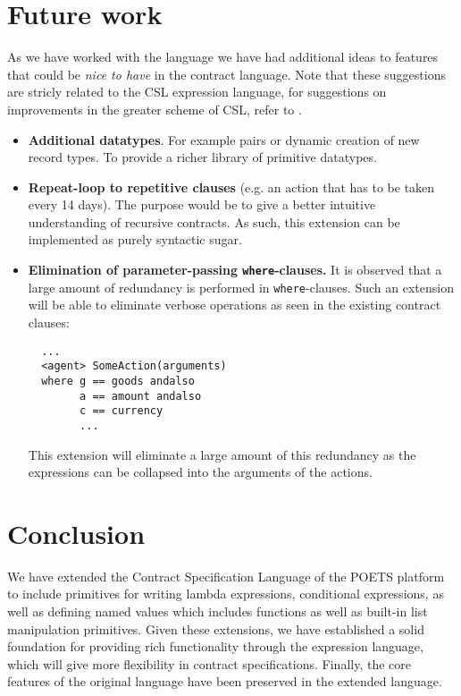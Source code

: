 \documentclass[10pt,a4paper,final,oneside,openany,article]{memoir}
\begin{document}
\chapter{Future work}
As we have worked with the language we have had additional ideas to
features that could be \textit{nice to have} in the contract language.
Note that these suggestions are stricly related to the CSL expression
language, for suggestions on improvements in the greater scheme of CSL,
refer to \cite{hvitved10}.
\begin{itemize}
\item \textbf{Additional datatypes}. For example pairs or dynamic
  creation of new record types. To provide a richer library of primitive
  datatypes.
\item \textbf{Repeat-loop to repetitive clauses} (e.g. an action that
  has to be taken every 14 days). The purpose would be to give a better
  intuitive understanding of recursive contracts. As such, this
  extension can be implemented as purely syntactic sugar.
\item \textbf{Elimination of parameter-passing \lstinline{where}-clauses.} It is
  observed that a large amount of redundancy is performed in
  \lstinline{where}-clauses. Such an extension will be able to eliminate
  verbose operations as seen in the existing contract clauses:
  \begin{lstlisting}
  ...
  <agent> SomeAction(arguments)
  where g == goods andalso
        a == amount andalso
        c == currency
        ...
  \end{lstlisting}
  This extension will eliminate a large amount of this redundancy as
  the expressions can be collapsed into the arguments of the actions.
\end{itemize}


\chapter{Conclusion}
We have extended the Contract Specification Language of the POETS
platform to include primitives for writing lambda expressions,
conditional expressions, as well as defining named values which includes
functions as well as built-in list manipulation primitives. Given these
extensions, we have established a solid foundation for providing rich
functionality through the expression language, which will give more
flexibility in contract specifications.
Finally, the core features of the original language \cite[page
4]{hvitved10} have been preserved in the extended language.
\end{document}
